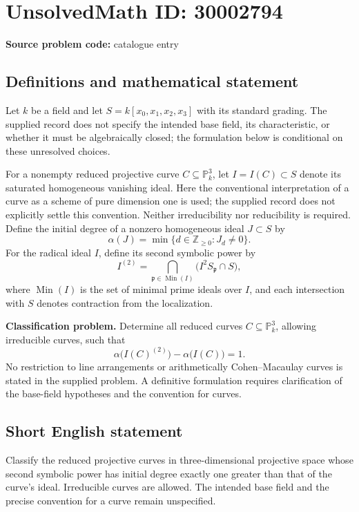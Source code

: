 \documentclass[11pt]{article}
\newcommand{\Z}{\mathbb{Z}}
\newcommand{\PP}{\mathbb{P}}
\begin{document}
\section*{UnsolvedMath ID: 30002794}
\textbf{Source problem code:} catalogue entry
\subsection{Definitions and mathematical statement}
Let \(k\) be a field and let \(S=k[x_0,x_1,x_2,x_3]\) with its standard grading. The supplied record does not specify the intended base field, its characteristic, or whether it must be algebraically closed; the formulation below is conditional on these unresolved choices.

For a nonempty reduced projective curve \(C\subseteq\PP^3_k\), let \(I=I(C)\subset S\) denote its saturated homogeneous vanishing ideal. Here the conventional interpretation of a curve as a scheme of pure dimension one is used; the supplied record does not explicitly settle this convention. Neither irreducibility nor reducibility is required. Define the initial degree of a nonzero homogeneous ideal \(J\subset S\) by
\[
\alpha(J)=\min\{d\in\Z_{\geq0}:J_d\neq0\}.
\]
For the radical ideal \(I\), define its second symbolic power by
\[
I^{(2)}=\bigcap_{\mathfrak p\in\operatorname{Min}(I)}\bigl(I^2S_{\mathfrak p}\cap S\bigr),
\]
where \(\operatorname{Min}(I)\) is the set of minimal prime ideals over \(I\), and each intersection with \(S\) denotes contraction from the localization.

\textbf{Classification problem.} Determine all reduced curves \(C\subseteq\PP^3_k\), allowing irreducible curves, such that
\[
\alpha\bigl(I(C)^{(2)}\bigr)-\alpha\bigl(I(C)\bigr)=1.
\]
No restriction to line arrangements or arithmetically Cohen--Macaulay curves is stated in the supplied problem. A definitive formulation requires clarification of the base-field hypotheses and the convention for curves.
\subsection{Short English statement}
Classify the reduced projective curves in three-dimensional projective space whose second symbolic power has initial degree exactly one greater than that of the curve's ideal. Irreducible curves are allowed. The intended base field and the precise convention for a curve remain unspecified.
\end{document}
